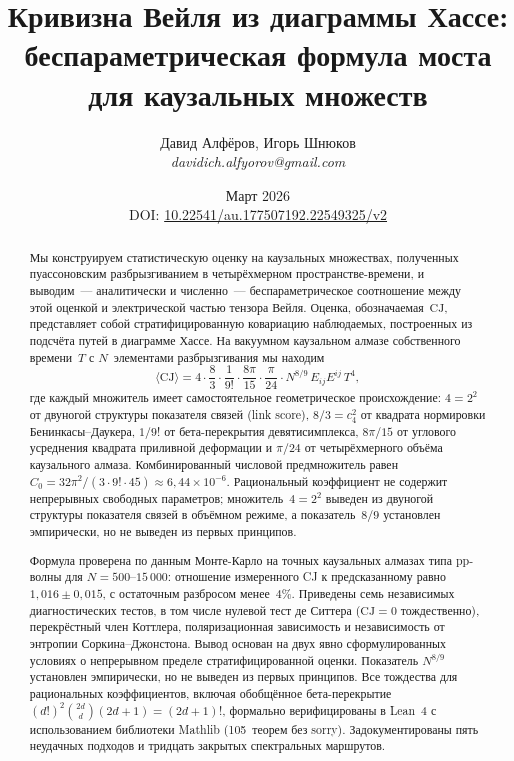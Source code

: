 \documentclass[12pt,a4paper]{article}
\title{Кривизна Вейля из диаграммы Хассе:\\
беспараметрическая формула моста для каузальных множеств}
\author{Давид Алфёров, Игорь Шнюков\\[4pt]
\small\textit{davidich.alfyorov@gmail.com}}
\date{Март 2026\\[4pt]
\small DOI: \href{https://doi.org/10.22541/au.177507192.22549325/v2}{10.22541/au.177507192.22549325/v2}}
\theoremstyle{plain}
\theoremstyle{definition}
\theoremstyle{remark}
\newcommand{\Esq}{E_{ij}E^{ij}}
\newcommand{\CJ}{\mathrm{CJ}}
\begin{document}
\maketitle

\begin{abstract}

Мы конструируем статистическую оценку на каузальных множествах,
полученных пуассоновским разбрызгиванием в четырёхмерном
пространстве-времени, и выводим~--- аналитически и
численно~--- беспараметрическое соотношение между этой
оценкой и электрической частью тензора Вейля.  Оценка,
обозначаемая~$\CJ$, представляет собой стратифицированную
ковариацию наблюдаемых, построенных из подсчёта путей в
диаграмме Хассе.  На вакуумном каузальном алмазе собственного
времени~$T$ с $N$~элементами разбрызгивания мы находим
\begin{equation}\label{eq:bridge-abstract}
  \langle \CJ \rangle
  = 4 \cdot \frac{8}{3} \cdot \frac{1}{9!}
    \cdot \frac{8\pi}{15} \cdot \frac{\pi}{24}
    \cdot N^{8/9}\, \Esq\, T^4,
\end{equation}
где каждый множитель имеет самостоятельное геометрическое
происхождение: $4 = 2^2$ от двуногой структуры показателя
связей (link score), $8/3 = c_4^2$ от квадрата нормировки
Бенинкасы--Даукера, $1/9!$ от бета-перекрытия
девятисимплекса, $8\pi/15$ от углового усреднения квадрата
приливной деформации и $\pi/24$ от четырёхмерного объёма
каузального алмаза.  Комбинированный числовой предмножитель
равен $C_0 = 32\pi^2/(3 \cdot 9! \cdot 45)
\approx 6{,}44 \times 10^{-6}$.  Рациональный коэффициент
не содержит непрерывных свободных параметров; множитель~$4 = 2^2$
выведен из двуногой структуры показателя связей в объёмном
режиме, а показатель~$8/9$ установлен эмпирически, но не
выведен из первых принципов.

Формула проверена по данным Монте-Карло на точных каузальных
алмазах типа pp-волны для $N = 500$--$15\,000$: отношение
измеренного CJ к предсказанному равно $1{,}016 \pm 0{,}015$,
с остаточным разбросом менее~$4\%$.  Приведены семь независимых
диагностических тестов, в том числе нулевой тест де Ситтера
($\CJ = 0$ тождественно), перекрёстный член Коттлера,
поляризационная зависимость и независимость от энтропии
Соркина--Джонстона.  Вывод основан на двух явно
сформулированных условиях о непрерывном пределе
стратифицированной оценки.  Показатель $N^{8/9}$ установлен
эмпирически, но не выведен из первых принципов.  Все
тождества для рациональных коэффициентов, включая обобщённое
бета-перекрытие
$(d!)^2\binom{2d}{d}(2d+1) = (2d+1)!$, формально верифицированы
в Lean~4 с использованием библиотеки Mathlib (105~теорем
без sorry).  Задокументированы пять неудачных подходов и
тридцать закрытых спектральных маршрутов.

\end{abstract}
\end{document}
